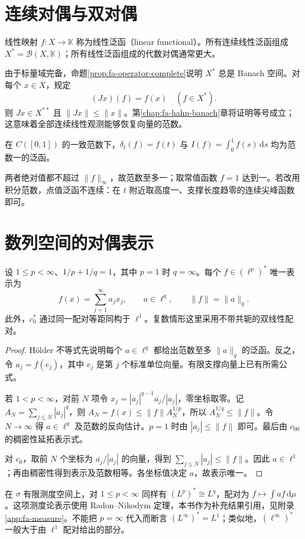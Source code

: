 \documentclass[UTF8,12pt,a4paper,fontset=fandol]{ctexbook}
\begin{document}
\section{连续对偶与双对偶}
\begin{definition}
线性映射 $f:X\to\mathbb K$ 称为线性泛函（linear functional）。所有连续线性泛函组成$X^*=\mathcal B(X,\mathbb K)$；所有线性泛函组成的代数对偶通常更大。
\end{definition}
由于标量域完备，命题\ref{prop:fa-operator-complete}说明 $X^*$ 总是 Banach 空间。对每个 $x\in X$，规定
\[
 (Jx)(f)=f(x)\quad(f\in X^*).
\]
则 $Jx\in X^{**}$ 且 $\|Jx\|\leq\|x\|$。第\ref{chap:fa-hahn-banach}章将证明等号成立；这意味着全部连续线性观测能够恢复向量的范数。

\begin{example}[点值与积分]
在 $C([0,1])$ 的一致范数下，$\delta_t(f)=f(t)$ 与 $I(f)=\int_0^1f(s)\,\mathrm ds$ 均为范数一的泛函。
\end{example}
\begin{solve}
两者绝对值都不超过 $\|f\|_\infty$，故范数至多一；取常值函数 $f=1$ 达到一。若改用积分范数，点值泛函不连续：在 $t$ 附近取高度一、支撑长度趋零的连续尖峰函数即可。
\end{solve}

\section{数列空间的对偶表示}
\begin{theorem}\label{thm:fa-sequence-dual}
设 $1\leq p<\infty$、$1/p+1/q=1$，其中 $p=1$ 时 $q=\infty$。每个 $f\in(\ell^p)^*$ 唯一表示为
\[
 f(x)=\sum_{j=1}^{\infty}a_jx_j,\qquad a\in\ell^q,
 \qquad\|f\|=\|a\|_q.
\]
此外，$c_0^*$ 通过同一配对等距同构于 $\ell^1$。复数情形这里采用不带共轭的双线性配对。
\end{theorem}
\begin{proof}
Hölder 不等式先说明每个 $a\in\ell^q$ 都给出范数至多 $\|a\|_q$ 的泛函。反之，令 $a_j=f(e_j)$，其中 $e_j$ 是第 $j$ 个标准单位向量。有限支撑向量上已有所需公式。

若 $1<p<\infty$，对前 $N$ 项令 $x_j=|a_j|^{q-1}\overline{a_j}/|a_j|$，零坐标取零。记 $A_N=\sum_{j\leq N}|a_j|^q$，则 $A_N=f(x)\leq\|f\|A_N^{1/p}$，所以 $A_N^{1/q}\leq\|f\|$。令 $N\to\infty$ 得 $a\in\ell^q$ 及范数的反向估计。$p=1$ 时由 $|a_j|\leq\|f\|$ 即可。最后由 $c_{00}$ 的稠密性延拓表示式。

对 $c_0$，取前 $N$ 个坐标为 $\overline{a_j}/|a_j|$ 的向量，得到 $\sum_{j\leq N}|a_j|\leq\|f\|$。因此 $a\in\ell^1$；再由稠密性得到表示及范数相等。各坐标值决定 $a$，故表示唯一。
\end{proof}
在 $\sigma$ 有限测度空间上，对 $1\leq p<\infty$ 同样有 $(L^p)^*\cong L^q$，配对为 $f\mapsto\int af\,\mathrm d\mu$。这项测度论表示使用 Radon--Nikodym 定理，本书作为补充结果引用，见附录\ref{app:fa-measure}。不能把 $p=\infty$ 代入而断言 $(L^\infty)^*=L^1$；类似地，$(\ell^\infty)^*$ 一般大于由 $\ell^1$ 配对给出的部分。
\end{document}

